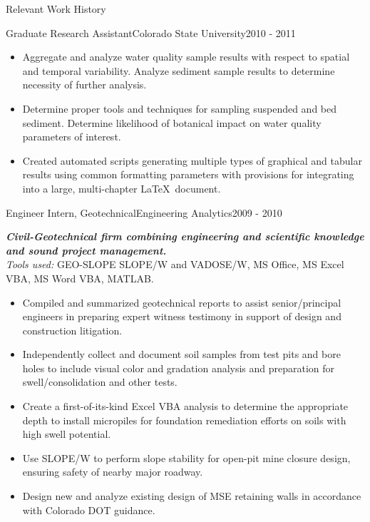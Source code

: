 \documentclass[]{mcdowellcv}
\newcommand{\smallspace}{\vspace{2pt}}
\newcommand{\compDesc}[1]{
	\textbf{\textit{#1}}
	\smallspace\\
}
\newcommand{\tools}[1]{
	\textit{Tools used: }#1
	\smallspace
}
\begin{document}
\begin{cvsection}{Relevant Work History}
\begin{cvsubsection}{Graduate Research Assistant}{Colorado State University}{2010 - 2011}
\begin{itemize}
			\smallspace
			\item  Aggregate and analyze water quality sample results with respect to spatial and temporal variability.  Analyze sediment sample results to determine necessity of further analysis.
			
			\smallspace
			\item Determine proper tools and techniques for sampling suspended and bed sediment. Determine likelihood of botanical impact on water quality parameters of interest.
			
			\smallspace
			\item Created automated scripts generating multiple types of graphical and tabular results using common formatting parameters with provisions for integrating into a large, multi-chapter \LaTeX\ document.
		
		\end{itemize}
	\end{cvsubsection}
	
	\begin{cvsubsection}{Engineer Intern, Geotechnical}{Engineering Analytics}{2009 - 2010}
		\compDesc{Civil-Geotechnical firm combining engineering and scientific knowledge and sound project management.}
		\tools{GEO-SLOPE SLOPE/W and VADOSE/W, MS Office, MS Excel VBA, MS Word VBA, MATLAB.}
		\begin{itemize}
			\item Compiled and summarized geotechnical reports to assist senior/principal engineers in preparing expert witness testimony in support of design and construction litigation.

			\smallspace
			\item Independently collect and document soil samples from test pits and bore holes to include visual color and gradation analysis and preparation for swell/consolidation and other tests. 
			
			\smallspace
			\item Create a first-of-its-kind Excel VBA analysis to determine the appropriate depth to install micropiles for foundation remediation efforts on soils with high swell potential.
			
			\smallspace
			\item Use SLOPE/W to perform slope stability for open-pit mine closure design, ensuring safety of nearby major roadway.
			
			\smallspace
			\item Design new and analyze existing design of MSE retaining walls in accordance with Colorado DOT guidance.
			

\end{itemize}
\end{cvsubsection}
\end{cvsection}
\end{document}
